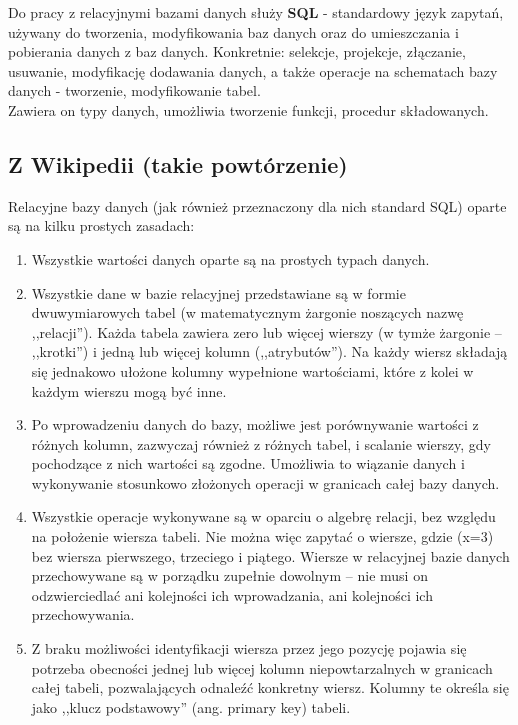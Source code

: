 \documentclass[a4paper,twoside]{report}
\begin{document}
Do pracy z relacyjnymi bazami danych służy \textbf{SQL} - standardowy język zapytań, używany do tworzenia, modyfikowania baz danych oraz do umieszczania i pobierania danych z baz danych.
Konkretnie: selekcje, projekcje, złączanie, usuwanie, modyfikację dodawania danych, a także operacje na schematach bazy danych - tworzenie, modyfikowanie tabel. \\
Zawiera on typy danych, umożliwia tworzenie funkcji, procedur składowanych.


\subsection{Z Wikipedii (takie powtórzenie)}
Relacyjne bazy danych (jak również przeznaczony dla nich standard SQL) oparte są na kilku prostych zasadach:

\begin{enumerate}
\item Wszystkie wartości danych oparte są na prostych typach danych.
\item Wszystkie dane w bazie relacyjnej przedstawiane są w formie dwuwymiarowych tabel (w matematycznym żargonie noszących nazwę ,,relacji''). Każda tabela zawiera zero lub więcej wierszy (w tymże żargonie – ,,krotki'') i jedną lub więcej kolumn (,,atrybutów''). Na każdy wiersz składają się jednakowo ułożone kolumny wypełnione wartościami, które z kolei w każdym wierszu mogą być inne.
\item Po wprowadzeniu danych do bazy, możliwe jest porównywanie wartości z różnych kolumn, zazwyczaj również z różnych tabel, i scalanie wierszy, gdy pochodzące z nich wartości są zgodne. Umożliwia to wiązanie danych i wykonywanie stosunkowo złożonych operacji w granicach całej bazy danych.
\item Wszystkie operacje wykonywane są w oparciu o algebrę relacji, bez względu na położenie wiersza tabeli. Nie można więc zapytać o wiersze, gdzie (x=3) bez wiersza pierwszego, trzeciego i piątego. Wiersze w relacyjnej bazie danych przechowywane są w porządku zupełnie dowolnym – nie musi on odzwierciedlać ani kolejności ich wprowadzania, ani kolejności ich przechowywania.
\item Z braku możliwości identyfikacji wiersza przez jego pozycję pojawia się potrzeba obecności jednej lub więcej kolumn niepowtarzalnych w granicach całej tabeli, pozwalających odnaleźć konkretny wiersz. Kolumny te określa się jako ,,klucz podstawowy'' (ang. primary key) tabeli.
\end{enumerate}
\end{document}
